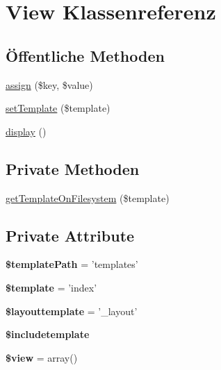\hypertarget{class_view}{\section{View Klassenreferenz}
\label{class_view}
}
\subsection*{Öffentliche Methoden}
\begin{DoxyCompactItemize}
\item 
\hyperlink{class_view_a2c338778c398ef0e4040bc377242611a}{assign} (\$key, \$value)
\item 
\hyperlink{class_view_a956eb733dd01bd0c42f06d71e11afef3}{set\-Template} (\$template)
\item 
\hyperlink{class_view_a0924100c5e1690a4150bb1c446859e07}{display} ()
\end{DoxyCompactItemize}
\subsection*{Private Methoden}
\begin{DoxyCompactItemize}
\item 
\hyperlink{class_view_a157300b213657f283da80e7430d9e98b}{get\-Template\-On\-Filesystem} (\$template)
\end{DoxyCompactItemize}
\subsection*{Private Attribute}
\begin{DoxyCompactItemize}
\item 
\hypertarget{class_view_a46020b2880e3138be7fd04e0a2a2944f}{{\bfseries \$template\-Path} = 'templates'}\label{class_view_a46020b2880e3138be7fd04e0a2a2944f}

\item 
\hypertarget{class_view_a4833469062d3f9086f204d4be985e9bc}{{\bfseries \$template} = 'index'}\label{class_view_a4833469062d3f9086f204d4be985e9bc}

\item 
\hypertarget{class_view_a6f6d4ba4ff5891b9fcaabf5ab1a888cd}{{\bfseries \$layouttemplate} = '\-\_\-layout'}\label{class_view_a6f6d4ba4ff5891b9fcaabf5ab1a888cd}

\item 
\hypertarget{class_view_add138b1b1fd0769b37c5338f2aa1316d}{{\bfseries \$includetemplate}}\label{class_view_add138b1b1fd0769b37c5338f2aa1316d}

\item 
\hypertarget{class_view_ad4ffe360a4edcdce1cf6abe276f1370f}{{\bfseries \$view} = array()}\label{class_view_ad4ffe360a4edcdce1cf6abe276f1370f}

\end{DoxyCompactItemize}



